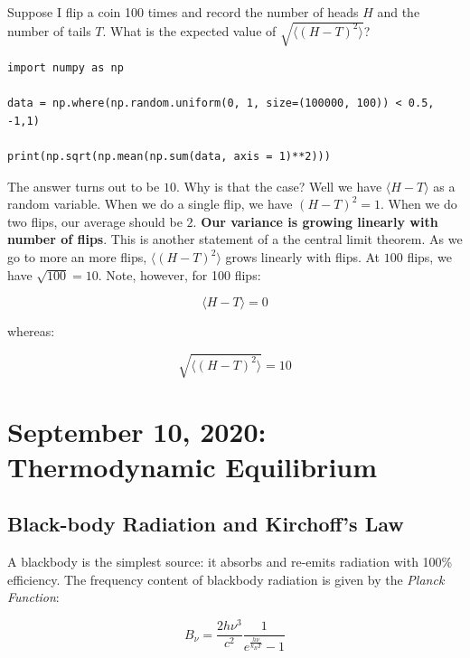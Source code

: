 \documentclass{article}
\begin{document}
Suppose I flip a coin 100 times and record the number of heads $H$ and the number of tails $T$. What is the expected value of $\sqrt{\langle (H - T)^2\rangle}$?


\begin{lstlisting}
import numpy as np

data = np.where(np.random.uniform(0, 1, size=(100000, 100)) < 0.5, -1,1)

print(np.sqrt(np.mean(np.sum(data, axis = 1)**2)))
\end{lstlisting}

The answer turns out to be $10$. Why is that the case? Well we have $\langle H - T\rangle$ as a random variable. When we do a single flip, we have $(H-T)^2 = 1$. When we do two flips, our average should be $2$. \textbf{Our variance is growing linearly with number of flips}. This is another statement of a the central limit theorem. As we go to more an more flips, $\langle (H-T)^2 \rangle$ grows linearly with flips. At $100$ flips, we have $\sqrt{100} = 10$. Note, however, for 100 flips:

\begin{equation}
    \langle H - T \rangle = 0
\end{equation}

whereas:

\begin{equation}
    \sqrt{\langle (H-T)^2 \rangle} = 10
\end{equation}




\newpage
\section{September 10, 2020: Thermodynamic Equilibrium}

\subsection{Black-body Radiation and Kirchoff's Law}

A blackbody is the simplest source: it absorbs and re-emits radiation with
100\% efficiency.  The frequency content of blackbody radiation is given by
the {\it Planck Function}:

\begin{equation}
\boxed{B_\nu = \frac{2h\nu^3}{c^2}\frac1{e^\frac{h\nu}{k_B T}-1}}
\end{equation}
\end{document}
